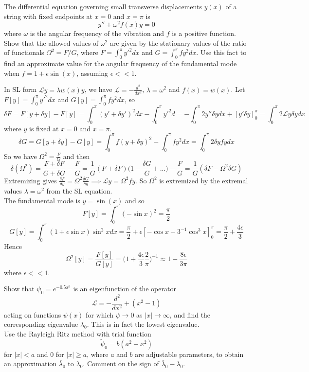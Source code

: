 \documentclass[a4paper]{article}
\begin{document}
\begin{qns}
The differential equation governing small transverse displacements $y(x)$ of a string with fixed endpoints at $x = 0$ and $x=\pi$ is $$y''+\omega^2f(x)y=0$$ where $\omega$ is the angular frequency of the vibration and $f$ is a positive function. Show that the allowed values of $\omega^2$ are given by the stationary values of the ratio of functionals $\Omega^2=F/G$, where $F=\int_0^\pi y'^2dx$ and $G=\int_0^\pi fy^2dx$. Use this fact to find an approximate value for the angular frequency of the fundamental mode when $f=1+\epsilon\sin(x)$, assuming $\epsilon<<1$.
\end{qns}
\begin{ans}
In SL form $\mathcal{L}y=\lambda w(x)y$, we have $\mathcal{L}=-\frac{d^2}{dx^2}$, $\lambda=\omega^2$ and $f(x)=w(x)$. Let $F[y]=\int_0^\pi y'^2dx$ and $G[y]=\int_0^\pi fy^2dx$, so
$$\delta F=F[y+\delta y]-F[y]=\int_0^\pi(y'+\delta y')^2dx-\int_0^\pi y'^2d=-\int_0^\pi 2y''\delta ydx+[y'\delta y]_0^\pi=\int_0^\pi2\mathcal{L}y\delta ydx$$
where $y$ is fixed at $x=0$ and $x=\pi$.
$$\delta G=G[y+\delta y]-G[y]=\int_0^\pi f(y+\delta y)^2-\int_0^\pi fy^2dx=\int_0^\pi 2\delta yfydx$$
So we have $\Omega^2=\frac{F}{G}$ and then
$$\delta(\Omega^2)=\frac{F+\delta F}{G+\delta G}-\frac{F}{G}=\frac{1}{G}(F+\delta F)\bigg(1-\frac{\delta G}{G}+...\bigg)-\frac{F}{G}=\frac{1}{G}(\delta F-\Omega^2\delta G)$$
Extremizing gives $\frac{\delta F}{\delta y}=\Omega^2\frac{\delta G}{\delta y}\implies\mathcal{L}y=\Omega^2fy$. So $\Omega^2$ is extremized by the extremal values $\lambda=\omega^2$ from the SL equation.\\[5pt]
The fundamental mode is $y=\sin(x)$ and so
$$F[y]=\int_0^\pi(-\sin x)^2=\frac{\pi}{2}$$
$$G[y]=\int_0^\pi(1+\epsilon\sin x)\sin^2xdx=\frac{\pi}{2}+\epsilon[-\cos x+3^{-1}\cos^3x]_0^\pi=\frac{\pi}{2}+\frac{4\epsilon}{3}$$
Hence
$$\Omega^2[y]=\frac{F[y]}{G[y]}=\bigg(1+\frac{4\epsilon}{3}\frac{2}{\pi}\bigg)^{-1}\approx 1-\frac{8\epsilon}{3\pi}$$
where $\epsilon<<1$.
\end{ans}
\begin{qns}
Show that $\psi_0=e^{-0.5x^2}$ is an eigenfunction of the operator
$$\mathcal{L}=-\frac{d^2}{dx^2}+(x^2-1)$$
acting on functions $\psi(x)$ for which $\psi\rightarrow0$ as $|x|\rightarrow\infty$, and find the corresponding eigenvalue $\lambda_0$. This is in fact the lowest eigenvalue.\\[5pt]
Use the Rayleigh Ritz method with trial function
$$\tilde{\psi}_0=b(a^2-x^2)$$
for $|x|<a$ and 0 for $|x|\geq a$, where $a$ and $b$ are adjustable parameters, to obtain an approximation $\overline{\lambda}_0$ to $\lambda_0$. Comment on the sign of $\overline{\lambda}_0-\lambda_0$.
\end{qns}
\end{document}
